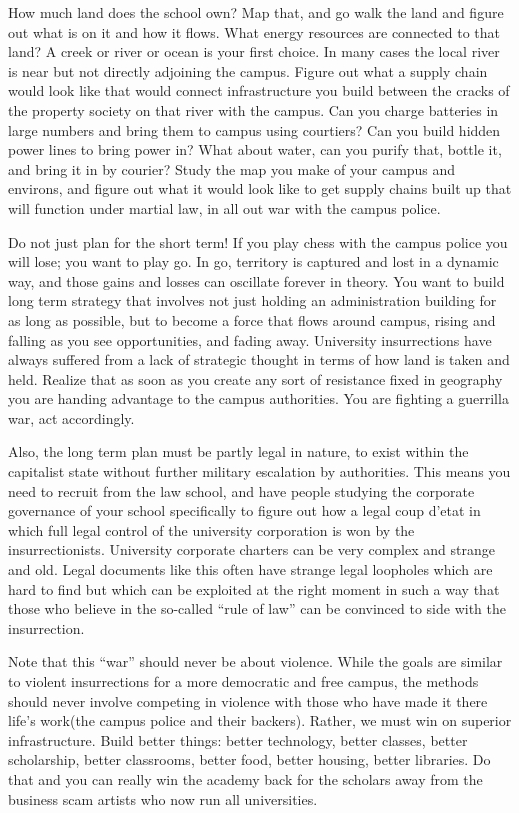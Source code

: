 How much land does the school own? Map that, and go walk the land and
figure out what is on it and how it flows. What energy resources are
connected to that land? A creek or river or ocean is your first choice.
In many cases the local river is near but not directly adjoining the
campus. Figure out what a supply chain would look like that would
connect infrastructure you build between the cracks of the property
society on that river with the campus. Can you charge batteries in large
numbers and bring them to campus using courtiers? Can you build hidden
power lines to bring power in? What about water, can you purify that,
bottle it, and bring it in by courier? Study the map you make of your
campus and environs, and figure out what it would look like to get
supply chains built up that will function under martial law, in all out
war with the campus police.

Do not just plan for the short term! If you play chess with the campus
police you will lose; you want to play go. In go, territory is captured
and lost in a dynamic way, and those gains and losses can oscillate
forever in theory. You want to build long term strategy that involves
not just holding an administration building for as long as possible, but
to become a force that flows around campus, rising and falling as you
see opportunities, and fading away. University insurrections have always
suffered from a lack of strategic thought in terms of how land is taken
and held. Realize that as soon as you create any sort of resistance
fixed in geography you are handing advantage to the campus authorities.
You are fighting a guerrilla war, act accordingly.

Also, the long term plan must be partly legal in nature, to exist within
the capitalist state without further military escalation by authorities.
This means you need to recruit from the law school, and have people
studying the corporate governance of your school specifically to figure
out how a legal coup d'etat in which full legal control of the
university corporation is won by the insurrectionists. University
corporate charters can be very complex and strange and old. Legal
documents like this often have strange legal loopholes which are hard to
find but which can be exploited at the right moment in such a way that
those who believe in the so-called ``rule of law'' can be convinced to
side with the insurrection.

Note that this ``war'' should never be about violence. While the goals
are similar to violent insurrections for a more democratic and free
campus, the methods should never involve competing in violence with
those who have made it there life's work(the campus police and their
backers). Rather, we must win on superior infrastructure. Build better
things: better technology, better classes, better scholarship, better
classrooms, better food, better housing, better libraries. Do that and
you can really win the academy back for the scholars away from the
business scam artists who now run all universities.

